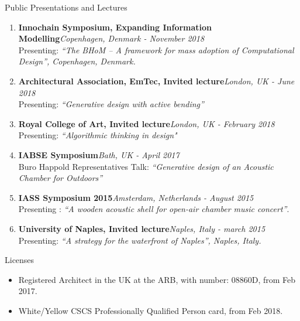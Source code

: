 \documentclass{resume}
\begin{document}
\begin{rSection}{Public Presentations and Lectures}
    \begin{enumerate}[leftmargin=0.45cm, itemsep=0em, topsep=0.5em, parsep=0.2em]
        \item \textbf{Innochain Symposium, Expanding Information Modelling}\hfill            \textit{Copenhagen, Denmark - November 2018} \\
            Presenting: \textit{“The BHoM – A framework for mass adoption of Computational Design”, Copenhagen, Denmark.}
        
        \item \textbf{Architectural Association, EmTec, Invited lecture}\hfill             \textit{London, UK - June 2018} \\
            Presenting: \textit{“Generative design with active bending”}
            
        \item \textbf{Royal College of Art, Invited lecture}\hfill \textit{London, UK - February 2018} \\
            Presenting: \textit{“Algorithmic thinking in design"}
            
        \item \textbf{IABSE Symposium}\hfill \textit{Bath, UK - April 2017} \\
            Buro Happold Representatives Talk: \textit{“Generative design of an Acoustic Chamber for Outdoors”}
    	
        \item \textbf{IASS Symposium 2015}\hfill \textit{Amsterdam, Netherlands - August 2015} \\
        Presenting : \textit{“A wooden acoustic shell for open-air chamber music concert”}.
    	
        \item \textbf{University of Naples, Invited lecture}\hfill \textit{Naples, Italy - march 2015} \\
    	Presenting: \textit{“A strategy for the waterfront of Naples”, Naples, Italy.}
    
    \end{enumerate}
\end{rSection}

\begin{rSection}{Licenses}
    \begin{itemize}[leftmargin=0.45cm, itemsep=0em, topsep=0.5em, parsep=0.2em]
        \item Registered Architect in the UK at the ARB, with number: 08860D, from Feb 2017.
        \item White/Yellow CSCS Professionally Qualified Person card, from Feb 2018.
    \end{itemize}
\end{rSection}
\end{document}
